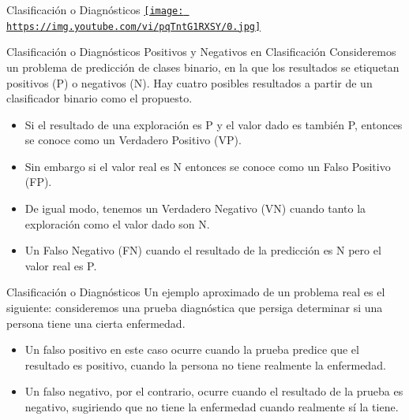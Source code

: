 \documentclass[
  ignorenonframetext,
]{beamer}
\providecommand{\tightlist}{%
  \setlength{\itemsep}{0pt}\setlength{\parskip}{0pt}}
\begin{document}
\begin{frame}{Clasificación o Diagnósticos}
\protect\hypertarget{clasificaciuxf3n-o-diagnuxf3sticos-3}{}
\href{https://www.youtube.com/watch?v=pqTntG1RXSY}{\texttt{[image: https://img.youtube.com/vi/pqTntG1RXSY/0.jpg]}}
\end{frame}

\begin{frame}{Clasificación o Diagnósticos}
\protect\hypertarget{clasificaciuxf3n-o-diagnuxf3sticos-4}{}
Positivos y Negativos en Clasificación Consideremos un problema de
predicción de clases binario, en la que los resultados se etiquetan
positivos (P) o negativos (N). Hay cuatro posibles resultados a partir
de un clasificador binario como el propuesto.

\begin{itemize}
\tightlist
\item
  Si el resultado de una exploración es P y el valor dado es también P,
  entonces se conoce como un Verdadero Positivo (VP).
\item
  Sin embargo si el valor real es N entonces se conoce como un Falso
  Positivo (FP).
\item
  De igual modo, tenemos un Verdadero Negativo (VN) cuando tanto la
  exploración como el valor dado son N.
\item
  Un Falso Negativo (FN) cuando el resultado de la predicción es N pero
  el valor real es P.
\end{itemize}
\end{frame}

\begin{frame}{Clasificación o Diagnósticos}
\protect\hypertarget{clasificaciuxf3n-o-diagnuxf3sticos-5}{}
Un ejemplo aproximado de un problema real es el siguiente: consideremos
una prueba diagnóstica que persiga determinar si una persona tiene una
cierta enfermedad.

\begin{itemize}
\tightlist
\item
  Un falso positivo en este caso ocurre cuando la prueba predice que el
  resultado es positivo, cuando la persona no tiene realmente la
  enfermedad.
\item
  Un falso negativo, por el contrario, ocurre cuando el resultado de la
  prueba es negativo, sugiriendo que no tiene la enfermedad cuando
  realmente sí la tiene.
\end{itemize}
\end{frame}
\end{document}
